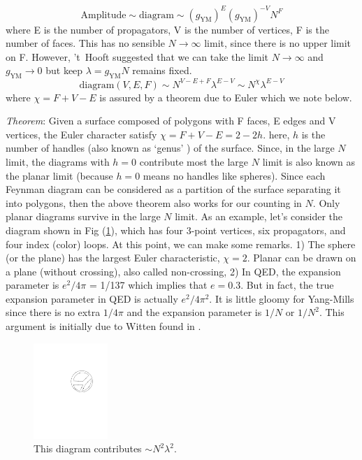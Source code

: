 \[  \text{Amplitude} \sim \text{diagram} \sim (g_{\text{YM}})^{E} (g_{\text{YM}})^{-V} N^{F} \] 
where E is the number of propagators, V is the number of vertices, F is the number of faces. This has no sensible
$N \to \infty$ limit, since there is no upper limit on F. However, 't~Hooft suggested that we can
take the limit $N \to \infty$ and $g_{\text{YM}} \to 0$ but keep $\lambda = g_{\text{YM}} N $ remains fixed. 
\[ \text{diagram}(V,E,F) \sim N^{V-E+F} \lambda^{E-V}  \sim N^{\chi} \lambda^{E-V} \] 
where $\chi = F + V - E$ is assured by a theorem due to Euler which we note below.  

\emph{Theorem}: Given a surface composed of polygons with F faces, E edges and V vertices, the Euler character satisfy
$\chi = F + V - E = 2 - 2h$. 
here, $h$ is the number of handles (also known as `genus' ) of the surface.
Since, in the large $N$ limit, the diagrams with $h = 0$ contribute most 
the large $N$ limit is also known as the planar limit (because $h=0$ means no handles like spheres). Since each Feynman 
diagram can be considered as a partition of the surface separating it into polygons, then the
above theorem also works for our counting in $N$. Only planar diagrams survive in the large $N$ limit.  
As an example, let's consider the diagram shown in Fig (\ref{fig:dia1}), which has four 3-point vertices, six propagators, and four index (color) loops. At this point, we can make some remarks. 1)  The sphere (or the plane) has the largest 
Euler characteristic, $\chi = 2$. 
Planar can be drawn on a plane (without crossing), also called non-crossing, 2) In QED, the expansion parameter is $e^2/4\pi$ = 
1/137 which implies that $e = 0.3$. But in fact, the true expansion parameter in QED is actually  $e^2/4\pi^2$. It is little gloomy 
for Yang-Mills since there is no
extra $1/4\pi$ and the expansion parameter is $1/N$ or $1/N^2$. This argument is initially due to Witten found in 
\cite{SCA}. 

\begin{figure}
 \label{fig:dia1}
\begin{center}\includegraphics[width=0.25\textwidth]{./Figures/DL5}\end{center}
\caption{\label{fig:dia1}This diagram contributes $\sim N^2 \lambda^2$.}
\end{figure}

